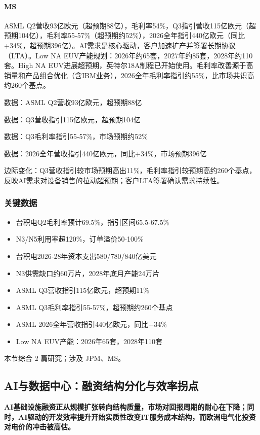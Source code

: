 \documentclass[11pt]{ctexart}
\begin{document}
\paragraph{MS} ASML Q2营收93亿欧元（超预期88亿），毛利率54\%，Q3指引营收115亿欧元（超预期104亿），毛利率55-57\%（超预期约52\%），2026全年指引440亿欧元（同比+34\%，超预期396亿）。AI需求是核心驱动，客户加速扩产并签署长期协议（LTA）。Low NA EUV产能规划：2026年约65套，2027年约85套，2028年约110套。High NA EUV进展超预期，英特尔18A制程已开始使用。毛利率改善源于高销量和产品组合优化（含IBM业务），2026全年毛利率指引约55\%，比市场共识高约260个基点。
{\small\color{refgray}数据：ASML Q2营收93亿欧元，超预期88亿\par}
{\small\color{refgray}数据：Q3营收指引115亿欧元，超预期104亿\par}
{\small\color{refgray}数据：Q3毛利率指引55-57\%，市场预期约52\%\par}
{\small\color{refgray}数据：2026全年营收指引440亿欧元，同比+34\%，市场预期396亿\par}
{\small\color{refgray}边际变化：Q3营收指引较市场预期高出11\%，毛利率指引较预期高约260个基点，反映AI需求对设备销售的拉动超预期；客户LTA签署确认需求持续性。\par}
\subsubsection*{关键数据}
\begin{itemize}
  \item 台积电Q2毛利率预计69.5\%，指引区间65.5-67.5\%
  \item N3/N5利用率超120\%，订单溢价50-100\%
  \item 台积电2026-28年资本支出580/780/840亿美元
  \item N3供需缺口约60万片，2028年底月产能24万片
  \item ASML Q3营收指引115亿欧元，超预期11\%
  \item ASML Q3毛利率指引55-57\%，超预期约260个基点
  \item ASML 2026全年营收指引440亿欧元，同比+34\%
  \item Low NA EUV产能：2026年65套，2028年110套
\end{itemize}
{\small\color{refgray}本节综合 2 篇研究；涉及 JPM、MS。}
\newpage
\subsection{AI与数据中心：融资结构分化与效率拐点}
\textbf{AI基础设施融资正从规模扩张转向结构质量，市场对回报周期的耐心在下降；同时，AI驱动的开发效率提升开始实质性改变IT服务成本结构，而欧洲电气化投资对电价的冲击被高估。}
\end{document}
